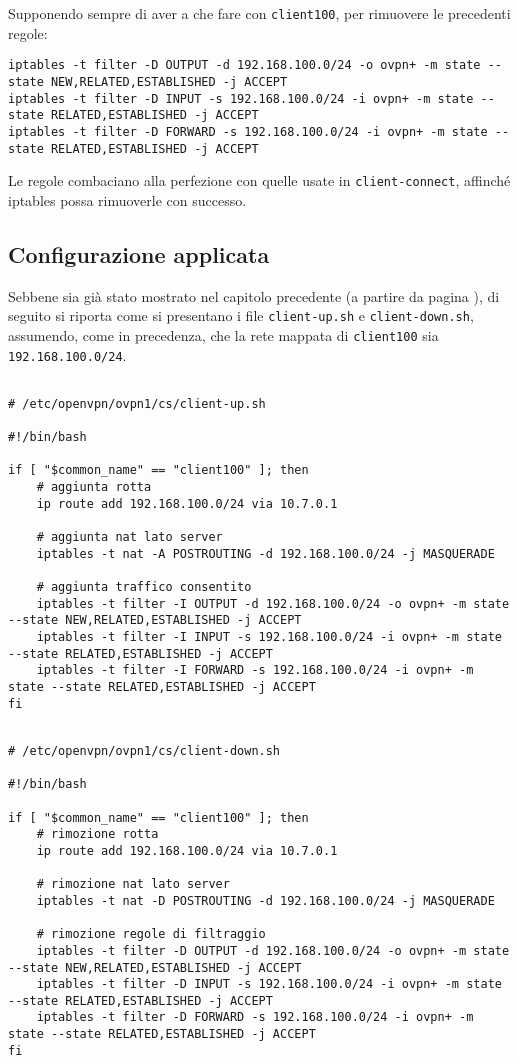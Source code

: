 		Supponendo sempre di aver a che fare con \texttt{client100}, per rimuovere le precedenti regole:
\begin{verbatim}
iptables -t filter -D OUTPUT -d 192.168.100.0/24 -o ovpn+ -m state --state NEW,RELATED,ESTABLISHED -j ACCEPT
iptables -t filter -D INPUT -s 192.168.100.0/24 -i ovpn+ -m state --state RELATED,ESTABLISHED -j ACCEPT
iptables -t filter -D FORWARD -s 192.168.100.0/24 -i ovpn+ -m state --state RELATED,ESTABLISHED -j ACCEPT   
\end{verbatim}
		Le regole combaciano alla perfezione con quelle usate in \texttt{client-connect}, affinché
        iptables possa rimuoverle con successo.
        

    \subsection{Configurazione applicata}
    Sebbene sia già stato mostrato nel capitolo precedente (a partire da pagina \pageref{sec:ending}),
    di seguito si riporta come si presentano i file \texttt{client-up.sh} e \texttt{client-down.sh},
    assumendo, come in precedenza, che la rete mappata di \texttt{client100} sia \texttt{192.168.100.0/24}.

\begin{verbatim}

# /etc/openvpn/ovpn1/cs/client-up.sh

#!/bin/bash
                
if [ "$common_name" == "client100" ]; then
    # aggiunta rotta
    ip route add 192.168.100.0/24 via 10.7.0.1

    # aggiunta nat lato server
    iptables -t nat -A POSTROUTING -d 192.168.100.0/24 -j MASQUERADE
        
    # aggiunta traffico consentito
    iptables -t filter -I OUTPUT -d 192.168.100.0/24 -o ovpn+ -m state --state NEW,RELATED,ESTABLISHED -j ACCEPT
    iptables -t filter -I INPUT -s 192.168.100.0/24 -i ovpn+ -m state --state RELATED,ESTABLISHED -j ACCEPT
    iptables -t filter -I FORWARD -s 192.168.100.0/24 -i ovpn+ -m state --state RELATED,ESTABLISHED -j ACCEPT
fi
\end{verbatim}
        
\begin{verbatim}

# /etc/openvpn/ovpn1/cs/client-down.sh
        
#!/bin/bash
             
if [ "$common_name" == "client100" ]; then
    # rimozione rotta
    ip route add 192.168.100.0/24 via 10.7.0.1

 	# rimozione nat lato server
    iptables -t nat -D POSTROUTING -d 192.168.100.0/24 -j MASQUERADE
        
    # rimozione regole di filtraggio
    iptables -t filter -D OUTPUT -d 192.168.100.0/24 -o ovpn+ -m state --state NEW,RELATED,ESTABLISHED -j ACCEPT
    iptables -t filter -D INPUT -s 192.168.100.0/24 -i ovpn+ -m state --state RELATED,ESTABLISHED -j ACCEPT
    iptables -t filter -D FORWARD -s 192.168.100.0/24 -i ovpn+ -m state --state RELATED,ESTABLISHED -j ACCEPT
fi
\end{verbatim}

